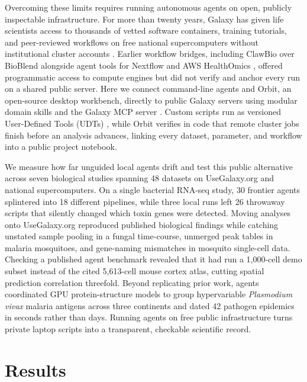 \documentclass[11pt,letterpaper]{article}
\newcommand{\tool}[1]{\textsf{#1}}
\begin{document}
Overcoming these limits requires running autonomous agents on open, publicly inspectable infrastructure. For more than twenty years, Galaxy has given life scientists access to thousands of vetted software containers, training tutorials, and peer-reviewed workflows on free national supercomputers without institutional cluster accounts \cite{galaxy2024, biocontainers2017, iuc2026, iwc2026, batut2018, hiltemann2023, foundry2026}. Earlier workflow bridges, including \tool{ClawBio} over \tool{BioBlend} alongside agent tools for \tool{Nextflow} and AWS HealthOmics \cite{clawbio2026, sloggett2013bioblend, seqeraai2026, healthomicsmcp2026}, offered programmatic access to compute engines but did not verify and anchor every run on a shared public server. Here we connect command-line agents and \tool{Orbit}, an open-source desktop workbench, directly to public Galaxy servers using modular domain skills and the Galaxy MCP server \cite{galaxymcp2026, galaxyskills2026}. Custom scripts run as versioned User-Defined Tools (UDTs) \cite{galaxyudt2026}, while \tool{Orbit} verifies in code that remote cluster jobs finish before an analysis advances, linking every dataset, parameter, and workflow into a public project notebook.

We measure how far unguided local agents drift and test this public alternative across seven biological studies spanning 48 datasets on UseGalaxy.org and national supercomputers. On a single bacterial RNA-seq study, 30 frontier agents splintered into 18 different pipelines, while three local runs left 26 throwaway scripts that silently changed which toxin genes were detected. Moving analyses onto UseGalaxy.org reproduced published biological findings while catching unstated sample pooling in a fungal time-course, unmerged peak tables in malaria mosquitoes, and gene-naming mismatches in mosquito single-cell data. Checking a published agent benchmark \cite{miao2026} revealed that it had run a 1,000-cell demo subset instead of the cited 5,613-cell mouse cortex atlas, cutting spatial prediction correlation threefold. Beyond replicating prior work, agents coordinated GPU protein-structure models to group hypervariable \textit{Plasmodium vivax} malaria antigens across three continents and dated 42 pathogen epidemics in seconds rather than days. Running agents on free public infrastructure turns private laptop scripts into a transparent, checkable scientific record.

\section{Results}
\end{document}
